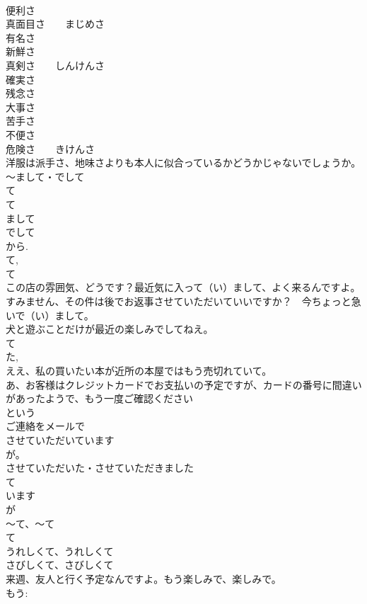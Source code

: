 \documentclass[8pt]{extreport}
\begin{document}
\begin{CJK}{UTF8}{min}
\\	便利さ
\\	真面目さ　　まじめさ
\\	有名さ
\\	新鮮さ
\\	真剣さ　　しんけんさ
\\	確実さ
\\	残念さ
\\	大事さ
\\	苦手さ
\\	不便さ
\\	危険さ　　きけんさ
\\	洋服は派手さ、地味さよりも本人に似合っているかどうかじゃないでしょうか。
\\	～まして・でして
\\	て
\\	て
\\	まして
\\	でして
\\	から. 
\\	て, 
\\	て 
\\	この店の雰囲気、どうです？最近気に入って（い）まして、よく来るんですよ。
\\	すみません、その件は後でお返事させていただいていいですか？　今ちょっと急いで（い）まして。
\\	犬と遊ぶことだけが最近の楽しみでしてねえ。
\\	て
\\	た, 
\\	ええ、私の買いたい本が近所の本屋ではもう売切れていて。
\\	あ、お客様はクレジットカードでお支払いの予定ですが、カードの番号に間違いがあったようで、もう一度ご確認ください
\\	という
\\	ご連絡をメールで
\\	させていただいています
\\	が。
\\	させていただいた・させていただきました 
\\	て 
\\	います 
\\	が 
\\	～て、～て
\\	て 
\\	うれしくて、うれしくて
\\	さびしくて、さびしくて
\\	来週、友人と行く予定なんですよ。もう楽しみで、楽しみで。
\\	もう: 

\end{CJK}
\end{document}
